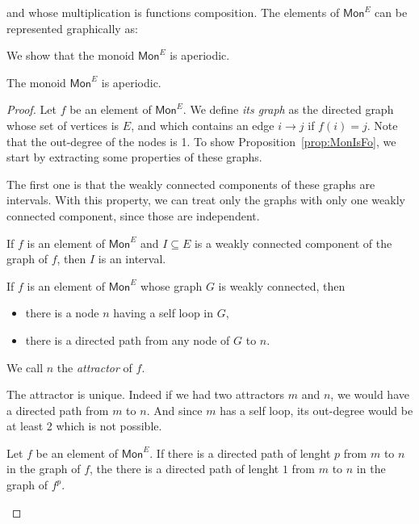 and whose multiplication is functions composition.  The elements of $\mathsf{Mon}^E$ can be represented graphically as:
     

We show that the monoid $\mathsf{Mon}^E$ is aperiodic.
     \begin{proposition}\label{prop:MonIsFo}
The monoid $\mathsf{Mon}^E$ is aperiodic.     
     \end{proposition}
     
     \begin{proof}
     Let $f$ be an element of $\mathsf{Mon}^E$. We define \emph {its graph} as the directed graph whose set of vertices is $E$, and which contains an edge $i\rightarrow j$ if $f(i)=j$. Note that the out-degree of the nodes is 1. To show Proposition~\ref{prop:MonIsFo}, we start by extracting some properties of these graphs.
     
The first one is that the weakly connected components of these graphs are intervals. With this property, we can treat only the graphs with only one weakly connected component, since those are independent. 
     \begin{lemma}
     If $f$ is an element of $\mathsf{Mon}^E$ and $I\subseteq E$ is a weakly connected component of the graph of $f$, then $I$ is an interval. 
     \end{lemma}
     
     \begin{lemma}
     If $f$ is an element of $\mathsf{Mon}^E$ whose graph $G$ is weakly connected, then 
\begin{itemize}
\item there is a node $n$  having a self loop in $G$,
\item there is a directed path from any node of $G$ to $n$. 
\end{itemize}     
 We call $n$ the \emph{attractor} of $f$.    
     \end{lemma}  
     The attractor is unique. Indeed if we had two attractors $m$ and $n$, we would have a directed path from $m$ to $n$. And since $m$ has a self loop, its out-degree would be at least 2 which is not possible. 
      
    \begin{lemma}
    Let $f$ be an element of $\mathsf{Mon}^E$.  If there is a directed path of lenght $p$ from $m$ to $n$ in the graph of $f$, the there is a directed path of lenght $1$ from $m$ to $n$ in the graph of $f^p$.
    \end{lemma}
     \end{proof}